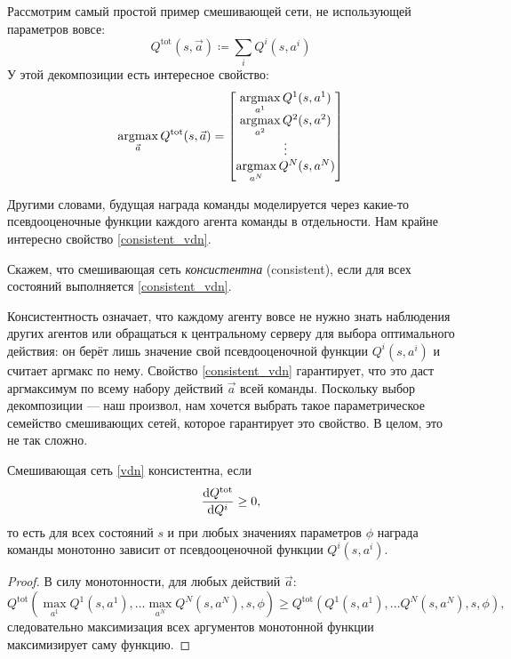 \begin{example} Рассмотрим самый простой пример смешивающей сети, не использующей параметров вовсе:
$$Q^{\mathrm{tot}}(s, \vec{a}) \coloneqq \sum_i Q^i(s, a^i)$$
У этой декомпозиции есть интересное свойство: 
\begin{equation}\label{consistent_vdn}
\mathop{\mathrm{argmax}}_{\vec{a}} Q^{\mathrm{tot}}(s, \vec{a}) = \left[ 
\begin{matrix}
\mathop{\mathrm{argmax}}\limits_{a^1} Q^1(s, a^1) \\
\mathop{\mathrm{argmax}}\limits_{a^2} Q^2(s, a^2) \\
\vdots \\
\mathop{\mathrm{argmax}}\limits_{a^N} Q^N(s, a^N) \\
\end{matrix}
\right]
\end{equation}
\end{example}

Другими словами, будущая награда команды моделируется через какие-то псевдооценочные функции каждого агента команды в отдельности. Нам крайне интересно свойство \eqref{consistent_vdn}.

\begin{definition}
Скажем, что смешивающая сеть \emph{консистентна} (consistent), если для всех состояний выполняется \eqref{consistent_vdn}.
\end{definition}

Консистентность означает, что каждому агенту вовсе не нужно знать наблюдения других агентов или обращаться к центральному серверу для выбора оптимального действия: он берёт лишь значение свой псевдооценочной функции $Q^i(s, a^i)$ и считает аргмакс по нему. Свойство \eqref{consistent_vdn} гарантирует, что это даст аргмаксимум по всему набору действий $\vec{a}$ всей команды. Поскольку выбор декомпозиции --- наш произвол, нам хочется выбрать такое параметрическое семейство смешивающих сетей, которое гарантирует это свойство. В целом, это не так сложно.

\begin{theorem}
Смешивающая сеть \eqref{vdn} консистентна, если
\begin{equation}\label{qmix_condition}
\frac{\mathop{}\!\mathrm{d} Q^{\mathrm{tot}}}{\mathop{}\!\mathrm{d} Q^i} \ge 0,
\end{equation}
то есть для всех состояний $s$ и при любых значениях параметров $\phi$ награда команды монотонно зависит от псевдооценочной функции $Q^i(s, a^i)$.
\begin{proof}
В силу монотонности, для любых действий $\vec{a}$:
$$Q^{\mathrm{tot}}( \max_{a^1} Q^1(s, a^1), \dots \max_{a^N} Q^N(s, a^N), s, \phi) \ge Q^{\mathrm{tot}}( Q^1(s, a^1), \dots Q^N(s, a^N), s, \phi),$$
следовательно максимизация всех аргументов монотонной функции максимизирует саму функцию.
\end{proof}
\end{theorem}

